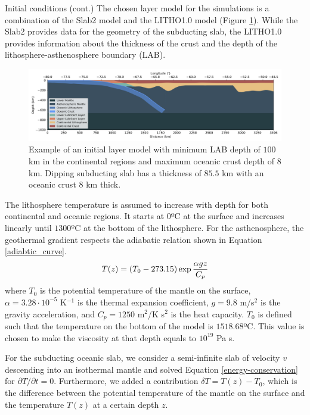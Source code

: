 \documentclass[final]{beamer}
\newlength{\colwidth}
\begin{document}
\begin{frame}[t]
\begin{columns}[t]
\begin{column}{\colwidth}
\begin{block}{Initial conditions (cont.)}
    \heading{\textcolor{darkblue}{Layer model}}
      The chosen layer model for the simulations is a combination of the Slab2 model \cite{hayes2018slab2} and the LITHO1.0 model \cite{pasyanos2014litho1} (Figure \ref{fig:interfaces}). While the Slab2 provides data for the geometry of the subducting slab, the LITHO1.0 provides information about the thickness of the crust and the depth of the lithosphere-asthenosphere boundary (LAB). 
      \begin{figure}
        \centering
        \includegraphics[width=0.3\paperwidth]{figures/interfaces.png}
        \caption{Example of an initial layer model with minimum LAB depth of $100$ km in the continental regions and maximum oceanic crust depth of $8$ km. Dipping subducting slab has a thickness of $85.5$ km with an oceanic crust $8$ km thick.}
        \label{fig:interfaces}
      \end{figure}
    \heading{\textcolor{darkblue}{Thermal structure}}
      The lithosphere temperature is assumed to increase with depth for both continental and oceanic regions. It starts at $0$ºC at the surface and increases linearly until $1300$ºC at the bottom of the lithosphere. For the asthenosphere, the geothermal gradient respects the adiabatic relation shown in Equation \ref{adiabtic_curve}.
      \begin{equation}{\label{adiabtic_curve}}
        T(z)=(T_0-273.15)\exp{\frac{\alpha g z}{C_p}}
      \end{equation}
      \noindent where $T_0$ is the potential temperature of the mantle on the surface, $\alpha=3.28\cdot 10^{-5}$ K$^{-1}$ is the thermal expansion coefficient, $g=9.8$ m/s$^2$ is the gravity acceleration, and $C_p=1250$ m$^2$/K s$^2$ is the heat capacity. $T_0$ is defined such that the temperature on the bottom of the model is $1518.68$ºC. This value is chosen to make the viscosity at that depth equals to $10^{19}$ Pa s.
    
      For the subducting oceanic slab, we consider a semi-infinite slab of velocity $v$ descending into an isothermal mantle and solved Equation \ref{energy-conservation} for $\partial T/\partial t=0$. Furthermore, we added a contribution $\delta T = T(z)-T_0$, which is the difference between the potential temperature of the mantle on the surface and the temperature $T(z)$ at a certain depth $z$.
   

\end{block}
\end{column}
\end{columns}
\end{frame}
\end{document}
